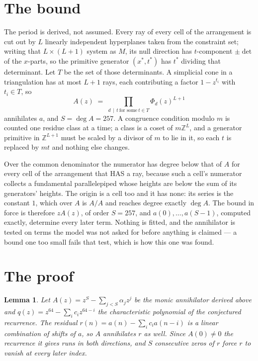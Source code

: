 \documentclass[11pt,a4paper]{article}
\theoremstyle{plain}
\newtheorem{lemma}[theorem]{Lemma}
\theoremstyle{definition}
\begin{document}
\section{The bound}

The period is derived, not assumed. Every ray of every cell of the arrangement is cut out by
$L$ linearly independent hyperplanes taken from the constraint set; writing that $L\times(L+1)$
system as $M$, its null direction has $t$-component $\pm\det$ of the $x$-parts, so the
primitive generator $(x^*,t^*)$ has $t^*$ dividing that determinant. Let $T$ be the set of
those determinants. A simplicial cone in a triangulation has at most $L+1$ rays, each
contributing a factor $1-z^{t_i}$ with $t_i\in T$, so
\[
A(z)\;=\;\prod_{d\,\mid\,t\ \text{for some}\ t\in T}\Phi_d(z)^{L+1}
\]
annihilates $a$, and $S=\deg A=257$. A congruence condition modulo $m$ is counted one residue
class at a time; a class is a coset of $m\mathbb{Z}^L$, and a generator primitive in
$\mathbb{Z}^{L+1}$ must be scaled by a divisor of $m$ to lie in it, so each $t$ is replaced
by $mt$ and nothing else changes.

Over the common denominator the numerator has degree below that of $A$ for every cell of the
arrangement that HAS a ray, because such a cell's numerator collects a fundamental
parallelepiped whose heights are below the sum of its generators' heights. The origin is a cell
too and it has none: its series is the constant $1$, which over $A$ is $A/A$ and reaches degree
exactly $\deg A$. The bound in force is therefore $zA(z)$, of order $S=257$, and
$a(0),\dots,a(S-1)$, computed exactly, determine every later term. Nothing is fitted, and the
annihilator is tested on terms the model was not asked for before anything is claimed --- a
bound one too small fails that test, which is how this one was found.

\section{The proof}

\begin{lemma}\label{lem:crit}
Let $A(z)=z^S-\sum_{j<S}\alpha_jz^{j}$ be the monic annihilator derived above and
$q(z)=z^{64}-\sum_ic_iz^{64-i}$ the characteristic polynomial of the conjectured
recurrence. The residual $r(n)=a(n)-\sum_ic_ia(n-i)$ is a linear combination of shifts of $a$,
so $A$ annihilates $r$ as well. Since $A(0)\ne0$ the recurrence it gives runs in both
directions, and $S$ consecutive zeros of $r$ force $r$ to vanish at every later index.
\end{lemma}
\end{document}
